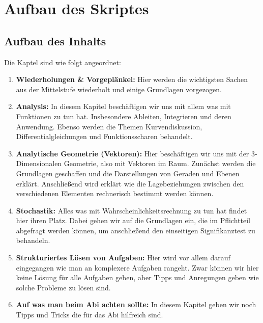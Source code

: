 \chapter*{Aufbau des Skriptes}
	\section*{Aufbau des Inhalts}
		Die Kaptel sind wie folgt angeordnet:
		\begin{enumerate}
		  \item \textbf{Wiederholungen \& Vorgeplänkel:} Hier werden die wichtigsten
		  Sachen aus der Mittelstufe wiederholt und einige Grundlagen vorgezogen.
		  \item \textbf{Analysis:} In diesem Kapitel beschäftigen wir uns mit allem
		  was mit Funktionen zu tun hat. Insbesondere Ableiten, Integrieren und deren
		  Anwendung. Ebenso werden die Themen Kurvendiskussion,
		  Differentialgleichungen und Funktionsscharen behandelt.
		  \item \textbf{Analytische Geometrie (Vektoren):} Hier beschäftigen wir uns
		  mit der 3-Dimensionalen Geometrie, also mit Vektoren im Raum. Zunächst
		  werden die Grundlagen geschaffen und die Darstellungen von Geraden und
		  Ebenen erklärt. Anschließend wird erklärt wie die Lagebeziehungen zwischen
		  den verschiedenen Elementen rechnerisch bestimmt werden können.
		  \item \textbf{Stochastik:} Alles was mit Wahrscheinlichkeitsrechnung zu tun
		  hat findet hier ihren Platz. Dabei gehen wir auf die Grundlagen ein, die im
		  Pflichtteil abgefragt werden können, um anschließend den einseitigen
		  Signifikanztest zu behandeln.
		  \item \textbf{Strukturiertes Lösen von Aufgaben:} Hier wird vor allem darauf
		  eingegangen wie man an komplexere Aufgaben rangeht. Zwar können wir hier
		  keine Lösung für alle Aufgaben geben, aber Tipps und Anregungen geben wie
		  solche Probleme zu lösen sind.
		  \item \textbf{Auf was man beim Abi achten sollte:} In diesem Kapitel geben
		  wir noch Tipps und Tricks die für das Abi hilfreich sind.
		\end{enumerate}
	
